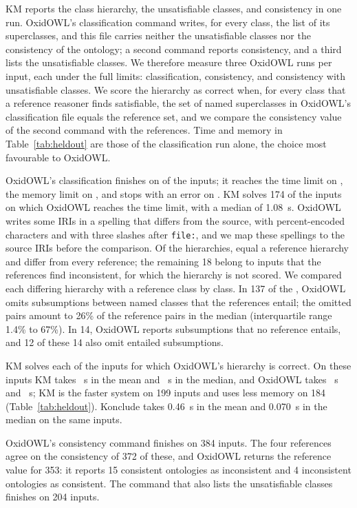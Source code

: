 KM reports the class hierarchy, the unsatisfiable classes, and consistency in
one run.  OxidOWL's classification command writes, for every class, the list
of its superclasses, and this file carries neither the unsatisfiable classes
nor the consistency of the ontology; a second command reports consistency,
and a third lists the unsatisfiable classes.  We therefore measure three
OxidOWL runs per input, each under the full limits: classification,
consistency, and consistency with unsatisfiable classes.  We score the
hierarchy as correct when, for every class that a reference reasoner finds
satisfiable, the set of named superclasses in OxidOWL's classification file
equals the reference set, and we compare the consistency value of the second
command with the references.  Time and memory in Table~\ref{tab:heldout} are
those of the classification run alone, the choice most favourable to OxidOWL.

OxidOWL's classification finishes on \OXFinished{} of the \HOInputs{} inputs;
it reaches the time limit on \OXTimeout{}, the memory limit on \OXMemout{}, and
stops with an error on \OXError.  KM solves 174 of the \OXTimeout{} inputs on
which OxidOWL reaches the time limit, with a median of 1.08~s.  OxidOWL writes
some IRIs in a spelling that differs from the source, with percent-encoded
characters and with three slashes after \texttt{file:}, and we map these
spellings to the source IRIs before the comparison.  Of the \OXFinished{}
hierarchies, \OXHierarchyCorrect{} equal a reference hierarchy and
\OXHierarchyWrong{} differ from every reference; the remaining 18 belong to
inputs that the references find inconsistent, for which the hierarchy is not
scored.  We compared each differing hierarchy with a reference class by class.
In 137 of the \OXHierarchyWrong, OxidOWL omits subsumptions between named
classes that the references entail; the omitted pairs amount to 26\% of the
reference pairs in the median (interquartile range 1.4\% to 67\%).  In 14,
OxidOWL reports subsumptions that no reference entails, and 12 of these 14
also omit entailed subsumptions.

KM solves each of the \OXCommon{} inputs for which OxidOWL's hierarchy is
correct.  On these inputs KM takes \OXKMMean{}~s in the mean and
\OXKMMedian{}~s in the median, and OxidOWL takes \OXMean{}~s and
\OXMedian{}~s; KM is the faster system on 199 inputs and uses less memory on
184 (Table~\ref{tab:heldout}).  Konclude takes 0.46~s in the mean and
0.070~s in the median on the same inputs.

OxidOWL's consistency command finishes on 384 inputs.  The four references
agree on the consistency of 372 of these, and OxidOWL returns the reference
value for 353: it reports 15 consistent ontologies as inconsistent and 4
inconsistent ontologies as consistent.  The command that also lists the
unsatisfiable classes finishes on 204 inputs.

